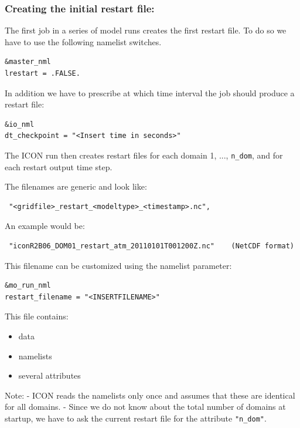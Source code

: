 \subsubsection{Creating the initial restart file:}

The first job in a series of model runs creates the first restart file.
To do so we have to use the following namelist switches.

\begin{verbatim}
&master_nml
lrestart = .FALSE. 
\end{verbatim}

In addition we have to prescribe at which time interval the job should produce a restart file:

\begin{verbatim}
&io_nml
dt_checkpoint = "<Insert time in seconds>" 
\end{verbatim}


The ICON run then creates restart files for each domain 1, ..., \verb+n_dom+, and for each restart
output time step. 

The filenames are generic and look like:

\begin{verbatim}
 "<gridfile>_restart_<modeltype>_<timestamp>.nc", 
\end{verbatim}

An example would be:

\begin{verbatim}
 "iconR2B06_DOM01_restart_atm_20110101T001200Z.nc"    (NetCDF format)
\end{verbatim}
   
This filename can be customized using the namelist parameter:
    
     
\begin{verbatim}
&mo_run_nml
restart_filename = "<INSERTFILENAME>" 
\end{verbatim}

This file contains:

\begin{itemize}
\item{data} 
\item{namelists}
\item{several attributes}
\end{itemize}


Note:
    -  ICON reads the namelists only once and assumes that these
       are identical for all domains.
    -  Since we do not know about the total number of domains at startup,
       we have to ask the current restart file for the attribute \verb+"n_dom"+.


